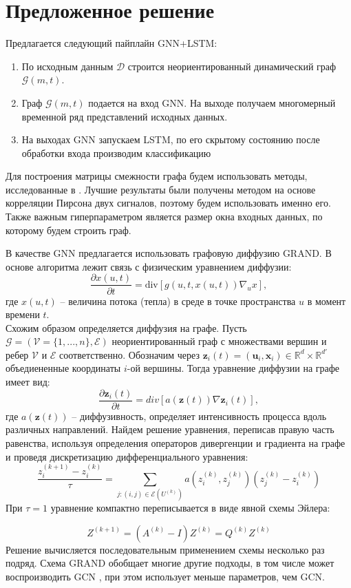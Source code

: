 \documentclass{article}
\begin{document}
\section{Предложенное решение}
Предлагается следующий пайплайн GNN+LSTM:
\begin{enumerate}
    \item По исходным данным $\mathcal{D}$ строится неориентированный динамический граф $\mathcal{G}(m, t)$.
    \item Граф $\mathcal{G}(m, t)$ подается на вход GNN. На выходе получаем многомерный временной ряд представлений исходных данных.
    \item На выходах GNN запускаем LSTM, по его скрытому состоянию после обработки входа производим классификацию
\end{enumerate}
Для построения матрицы смежности графа будем использовать методы, исследованные в \cite{varenik2022}. Лучшие результаты были получены методом на основе корреляции Пирсона двух сигналов, поэтому будем использовать именно его. Также важным гиперпараметром является размер окна входных данных, по которому будем строить граф.
\par
В качестве GNN предлагается использовать графовую диффузию GRAND. В основе алгоритма лежит связь с физическим уравнением диффузии:
$$
\frac{\partial x(u,t)}{\partial t} = \text{div}[g(u, t, x(u,t))\nabla_u x],
$$
где $x(u,t)$ -- величина потока (тепла) в среде в точке пространства $u$ в момент времени $t$. \\Схожим образом определяется диффузия на графе. Пусть $\mathcal{G} = (\mathcal{V}=\{1,...,n\},\mathcal{E})$ неориентированный граф с множествами вершин и ребер $\mathcal{V}$ и $\mathcal{E}$ соответственно. Обозначим через $\mathbf{z}_i(t) = (\mathbf{u}_i, \mathbf{x}_i)\in\mathbb{R}^d\times\mathbb{R}^{d'}$ объедиененные координаты $i$-ой вершины. Тогда уравнение диффузии на графе имеет вид:
$$ \frac{\partial{\mathbf{z}_i(t)}}{\partial{t}} = div [a(\mathbf{z}(t))\nabla \mathbf{z}_i(t)],
$$
где $a(\mathbf{z}(t))$ -- диффузивность, определяет интенсивность процесса вдоль различных направлений. Найдем решение уравнения, переписав правую часть равенства, используя определения операторов дивергенции и градиента на графе и проведя дискретизацию дифференциального уравнения:
$$
    \frac{z^{(k+1)}_i - z^{(k)}_i}{\tau} = \sum\limits_{j:(i,j)\in\mathcal{E}(U^{(k)})}a(z^{(k)}_i, z^{(k)}_j)(z^{(k)}_j - z^{(k)}_i) 
$$
При $\tau = 1$ уравнение компактно переписывается в виде явной схемы Эйлера:

$$ Z^{(k+1)} = (A^{(k)} - I)Z^{(k)} = Q^{(k)}Z^{(k)}$$
Решение вычисляется последовательным применением схемы несколько раз подряд. Схема GRAND обобщает многие другие подходы, в том числе может воспроизводить GCN \cite{chamberlain2021blend}, при этом использует меньше параметров, чем GCN.
\end{document}
